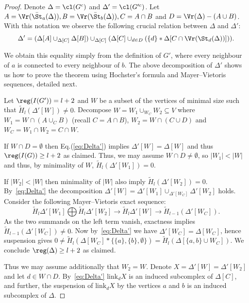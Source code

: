 \begin{proof}
Denote $\Delta=\cl(G^c)$ and $\Delta'=\cl(G'^c)$.
Let $A=\Vr(\bar{\St}_a (\Delta)),B=\Vr(\bar{\St}_b(\Delta)), C=A\cap B$ and $D=\Vr(\Delta)-(A\cup B)$. With this notation we observe the following crucial relation between $\Delta$ and $\Delta'$:
\begin{equation}\label{eq:Delta'}
 \Delta'=(\Delta[A]\cup_{\Delta[C]} \Delta[B])\cup_{\Delta[C]} (\Delta[C] \cup_{d\in D} (\{d\}*\Delta[C \cap \Vr(\St_d (\Delta))])).
\end{equation}

 We obtain this equality simply from the definition of $G'$, where every neighbour of $a$ is connected to every neighbour of $b$.
 The above decomposition of $\Delta'$ shows us how to prove the theorem using Hochster's formula and Mayer--Vietoris sequences, detailed next.


 Let $\reg(I(G')) = l+2$ and $W$ be a subset of the vertices of minimal size such that $\widetilde{H}_l (\Delta'[W]) \neq 0$.
 Decompose $W=W_1 \cup_{W_C} W_2 \subseteq V$ where $W_1=W\cap(A\cup_C B)$ (recall $C=A\cap B$), $W_2=W\cap(C\cup D)$ and $W_C=W_1\cap W_2=C \cap W$.

If $W\cap D=\emptyset$ then Eq.(\ref{eq:Delta'}) implies $\Delta'[W]=\Delta[W]$ and thus $\reg(I(G))\ge l+2$ as claimed.
Thus, we may assume
$W\cap D\neq \emptyset$, so $|W_1|<|W|$ and thus, by minimality of $W$, $\widetilde{H}_l(\Delta'[W_1])=0$.

If $|W_2|<|W|$ then minimality of $|W|$ also imply $\widetilde{H}_l(\Delta'[W_2])=0$.
By~\eqref{eq:Delta'} the decomposition $\Delta'[W]=\Delta'[W_1] \cup_{\Delta'[W_C]} \Delta'[W_2]$ holds. Consider the following Mayer--Vietoris exact sequence: $$\widetilde{H}_l \Delta'[W_1] \bigoplus \widetilde{H}_l \Delta'[W_2] \longrightarrow \widetilde{H}_l \Delta'[W] \longrightarrow \widetilde{H}_{l-1} (\Delta'[W_C]).$$
As the two summands on the left term vanish, exactness implies
$\widetilde{H}_{l-1} (\Delta'[W_C])\neq 0$. 
Now by~\eqref{eq:Delta'} we have  $\Delta'[W_C]=\Delta[W_C]$, hence suspension gives
  $0 \neq \widetilde{H}_l(\Delta[W_C] * \{\{a\},\{b\},\emptyset\})= \widetilde{H}_l(\Delta[\{a,b\} \cup W_C])$.
 We conclude $\reg (\Delta) \geq l+2$ as claimed.

Thus we may assume additionally that
$W_2=W$. 
Denote $X=\Delta'[W]=\Delta'[W_2]$ and let $d\in W\cap D$.
By~\eqref{eq:Delta'} $\text{link}_d X$ is an induced subcomplex of $\Delta[C]$, and further, the suspension of $\text{link}_d X$ by the vertices $a$ and $b$ is an induced
subcomplex of $\Delta$.


\end{proof}
